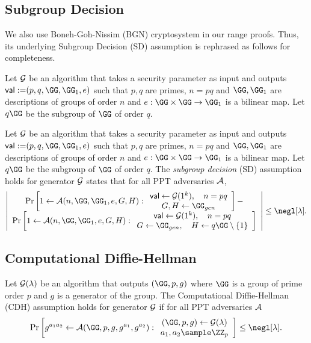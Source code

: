 \subsection{Subgroup Decision}
We also use Boneh-Goh-Nissim (BGN) cryptosystem \cite{TCC:BonGohNis05} in our range proofs. Thus, its underlying Subgroup Decision (SD) assumption is rephrased as follows for completeness.

Let $\mathcal{G}$ be an algorithm that takes a security parameter as input and
outputs $\mathsf{val:=}(p,q,\GG,\GG_1,e)$ such that $p,q$ are primes, $n = pq$ and $\GG, \GG_1$ are descriptions of groups of order $n$
and $e:\GG \times \GG \to \GG_1$ is a bilinear map.
Let $q\GG$ be the subgroup of $\GG$ of order $q$. 


\begin{definition}
Let $\mathcal{G}$ be an algorithm that takes a security parameter as input and
outputs $\mathsf{val:=}(p,q,\GG,\GG_1,e)$ such that $p,q$ are primes, $n = pq$ and $\GG, \GG_1$ are descriptions of groups of order $n$
and $e:\GG \times \GG \to \GG_1$ is a bilinear map.
Let $q\GG$ be the subgroup of $\GG$ of order $q$. 
The \emph{subgroup decision} (SD) assumption holds for generator $\mathcal{G}$ states that for all PPT adversaries $\mathcal{A}$,
$$
\left| \begin{array}{c}
     \Pr\left[1\leftarrow\Ac(n,\GG,\GG_1,e,G,H):\begin{array}{c}
     \mathsf{val}\gets \Gc(1^k), \quad n=pq  \\
     G,H\gets\GG_{gen}
\end{array} \right] - \\
\Pr\left[1\leftarrow \Ac(n,\GG,\GG_1,e,G,H):\begin{array}{c}
     \mathsf{val}\gets\Gc(1^k), \quad
     n=pq \\
     G\gets\GG_{gen}, \quad 
     H\gets q\GG\setminus\{1\}
\end{array}\right]
\end{array}
\right|\leq \negl[\lambda].$$
\end{definition}

\subsection{Computational Diffie-Hellman}
\begin{definition}
Let $\mathcal{G}(\lambda)$ be an algorithm that outputs $(\GG,p,g)$ where $\GG$ is a group of prime order $p$ and $g$ is a generator of the group. The Computational Diffie-Hellman (CDH) assumption holds for generator $\mathcal{G}$ if for all PPT adversaries $\mathcal{A}$ $$\Pr\left[g^{a_1a_2}\leftarrow\Ac(\GG,p,g,g^{a_1},g^{a_2}):\begin{array}{c}
     (\GG,p,g)\leftarrow\Gc(\lambda)  \\
     a_1,a_2\sample \ZZ_p
\end{array}\right]\leq \negl[\lambda].$$
\end{definition}

